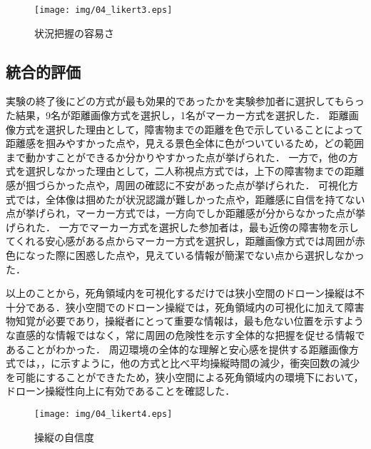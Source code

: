\documentclass[submit, sigrecommended]{ipsj}
\begin{document}
\begin{figure}[tb]
  \centering
  \texttt{[image: img/04\_likert3.eps]}
  \caption{状況把握の容易さ}
  \label{fig:04_likert3}
  \end{figure}

\subsection{統合的評価}
実験の終了後にどの方式が最も効果的であったかを実験参加者に選択してもらった結果，9名が距離画像方式を選択し，1名がマーカー方式を選択した．
距離画像方式を選択した理由として，障害物までの距離を色で示していることによって距離感を掴みやすかった点や，見える景色全体に色がついているため，どの範囲まで動かすことができるか分かりやすかった点が挙げられた．
一方で，他の方式を選択しなかった理由として，二人称視点方式では，上下の障害物までの距離感が掴づらかった点や，周囲の確認に不安があった点が挙げられた．
可視化方式では，全体像は掴めたが状況認識が難しかった点や，距離感に自信を持てない点が挙げられ，マーカー方式では，一方向でしか距離感が分からなかった点が挙げられた．
一方でマーカー方式を選択した参加者は，最も近傍の障害物を示してくれる安心感がある点からマーカー方式を選択し，距離画像方式では周囲が赤色になった際に困惑した点や，見えている情報が簡潔でない点から選択しなかった．
\par
以上のことから，死角領域内を可視化するだけでは狭小空間のドローン操縦は不十分である．狭小空間でのドローン操縦では，死角領域内の可視化に加えて障害物知覚が必要であり，操縦者にとって重要な情報は，最も危ない位置を示すような直感的な情報ではなく，常に周囲の危険性を示す全体的な把握を促せる情報であることがわかった．
周辺環境の全体的な理解と安心感を提供する距離画像方式では，，に示すように，他の方式と比べ平均操縦時間の減少，衝突回数の減少を可能にすることができたため，狭小空間による死角領域内の環境下において，ドローン操縦性向上に有効であることを確認した．


\begin{figure}[tb]
  \centering
  \texttt{[image: img/04\_likert4.eps]}
  \caption{操縦の自信度}
  \label{fig:04_likert4}
  \end{figure}
  
\end{document}
